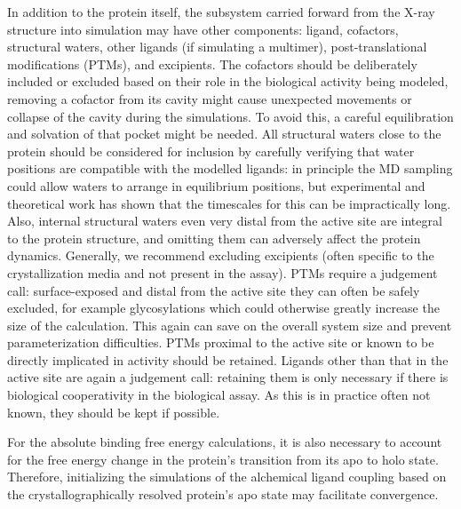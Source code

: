 \documentclass[9pt,bestpractices]{livecoms}
\begin{document}
In addition to the protein itself, the subsystem carried forward from the X-ray structure into simulation may have other components: ligand, cofactors, structural waters, other ligands (if simulating a multimer), post-translational modifications (PTMs), and excipients. The cofactors should be deliberately included or excluded based on their role in the biological activity being modeled, removing a cofactor from its cavity might cause unexpected movements or collapse of the cavity during the simulations. To avoid this, a careful equilibration and solvation of that pocket might be needed. All structural waters close to the protein should be considered for inclusion by carefully verifying that water positions are compatible with the modelled ligands: in principle the MD sampling could allow waters to arrange in equilibrium positions, but experimental and theoretical work has shown that the timescales for this can be impractically long. Also, internal structural waters even very distal from the active site are integral to the protein structure, and omitting them can adversely affect the protein dynamics. Generally, we recommend excluding excipients (often specific to the crystallization media and not present in the assay). PTMs require a judgement call: surface-exposed and distal from the active site they can often be safely excluded, for example glycosylations which could otherwise greatly increase the size of the calculation. This again can save on the overall system size and prevent parameterization difficulties. PTMs proximal to the active site or known to be directly implicated in activity should be retained. Ligands other than that in the active site are again a judgement call: retaining them is only necessary if there is biological cooperativity in the biological assay. As this is in practice often not known, they should be kept if possible. 

For the absolute binding free energy calculations, it is also necessary to account for the free energy change in the protein's transition from its apo to holo state. Therefore, initializing the simulations of the alchemical ligand coupling based on the crystallographically resolved protein's apo state may facilitate convergence.
\end{document}
